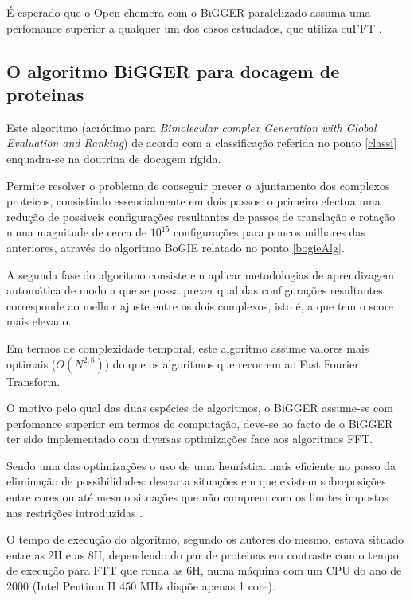  É esperado que o Open-chemera com o BiGGER paralelizado assuma uma perfomance superior a qualquer um dos casos estudados, que utiliza cuFFT . 
 

\subsection{O algoritmo BiGGER para docagem de proteinas}
\label{biggerAlg}
Este algoritmo (acrónimo para \textit{Bimolecular complex Generation with Global Evaluation and Ranking}) \cite{teseProf} de acordo com a classificação referida no ponto \ref{classi} enquadra-se na doutrina de docagem rígida\cite{biggerPaper}.

Permite resolver o problema de conseguir prever o ajuntamento dos complexos proteicos, consistindo essencialmente em dois passos: o primeiro efectua uma redução de possiveis configurações resultantes de passos de translação e rotação numa magnitude de cerca de $10^{15}$ configurações para poucos milhares das anteriores, através do algoritmo BoGIE relatado no ponto \ref{bogieAlg}.

A segunda fase do algoritmo consiste em aplicar metodologias de aprendizagem automática de modo a que se possa prever qual das configurações resultantes corresponde ao melhor ajuste entre os dois complexos, isto é, a que tem o score mais elevado.
 
Em termos de complexidade temporal, este algoritmo assume valores mais optimais ($O(N^{2,8})$) do que os algoritmos que recorrem ao Fast Fourier Transform. 

O motivo pelo qual das duas espécies de algoritmos, o BiGGER assume-se com perfomance superior em termos de computação, deve-se ao facto de o BiGGER ter sido implementado com diversas optimizações face aos algoritmos FFT. 

Sendo uma das optimizações o uso de uma heurística mais eficiente no passo da eliminação de possibilidades: descarta situações em que existem sobreposições entre cores ou até mesmo situações que não cumprem com os limites impostos nas restrições introduzidas \cite{biggerPaper}. 

O tempo de execução do algoritmo, segundo os autores do mesmo, estava situado entre as 2H e as 8H, dependendo do par de proteinas em contraste com o tempo de execução para FTT que ronda as 6H, numa máquina com um CPU do ano de 2000 (Intel Pentium II 450 MHz dispõe apenas 1 core)\cite{biggerPaper}. 

